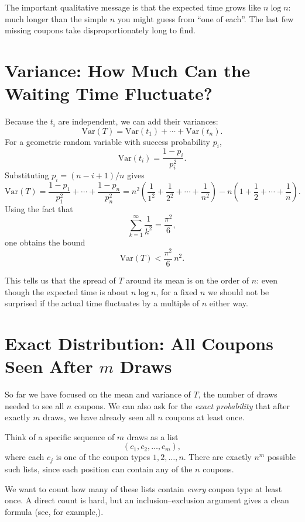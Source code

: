 The important qualitative message is that the expected time grows like
\(n \log n\): much longer than the simple \(n\) you might guess from ``one of
each''.  The last few missing coupons take disproportionately long to find.

\section{Variance: How Much Can the Waiting Time Fluctuate?}
Because the \(t_i\) are independent, we can add their variances:
\[
  \mathrm{Var}(T)
  = \mathrm{Var}(t_1) + \cdots + \mathrm{Var}(t_n).
\]
For a geometric random variable with success probability \(p_i\),
\[
  \mathrm{Var}(t_i) = \frac{1-p_i}{p_i^2}.
\]
Substituting \(p_i = (n-i+1)/n\) gives
\[
  \mathrm{Var}(T)
  = \frac{1-p_1}{p_1^2} + \cdots + \frac{1-p_n}{p_n^2}
  = n^2\left(\frac{1}{1^2} + \frac{1}{2^2} + \cdots + \frac{1}{n^2}\right)
    - n\left(1 + \frac{1}{2} + \cdots + \frac{1}{n}\right).
\]
Using the fact that
\[
  \sum_{k=1}^{\infty}\frac{1}{k^2} = \frac{\pi^2}{6},
\]
one obtains the bound
\[
  \mathrm{Var}(T) < \frac{\pi^2}{6}\,n^2.
\]

This tells us that the spread of \(T\) around its mean is on the order of
\(n\): even though the expected time is about \(n\log n\), for a fixed \(n\) we
should not be surprised if the actual time fluctuates by a multiple of \(n\)
either way.

\section{Exact Distribution: All Coupons Seen After \texorpdfstring{$m$}{m} Draws}
So far we have focused on the mean and variance of \(T\), the number of draws
needed to see all \(n\) coupons.  We can also ask for the \emph{exact
probability} that after exactly \(m\) draws, we have already seen all \(n\)
coupons at least once.

Think of a specific sequence of \(m\) draws as a list
\[
  (c_1,c_2,\dots,c_m),
\]
where each \(c_j\) is one of the coupon types \(1,2,\dots,n\).  There are
exactly \(n^m\) possible such lists, since each position can contain any of the
\(n\) coupons.

We want to count how many of these lists contain \emph{every} coupon type at
least once.  A direct count is hard, but an inclusion--exclusion argument
gives a clean formula (see, for example,\cite{693222-combinatorics-coupon}).

